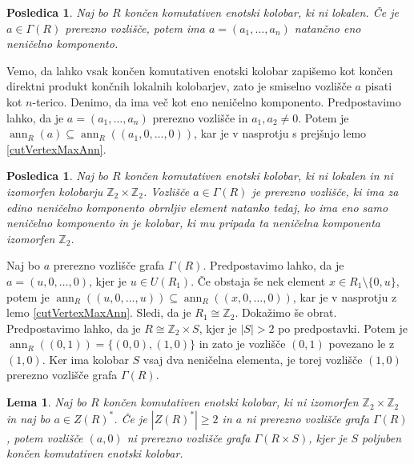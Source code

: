 \documentclass[a4paper, 12pt]{amsart}
\theoremstyle{definition} %
\theoremstyle{plain} %
\newtheorem{lema}[definicija]{Lema}
\newtheorem{posledica}[definicija]{Posledica}
\newcommand{\Z}{\mathbb Z}
\DeclareMathOperator{\ann}{ann}
\begin{document}
\begin{posledica}
\label{cutVertexOneNonzeroComponent}
Naj bo $R$ končen komutativen enotski kolobar, ki ni lokalen. Če je $a\in \Gamma(R)$ prerezno vozlišče, potem ima $a= (a_1,\dots,a_n)$ natančno eno neničelno komponento.
\end{posledica}

\proof
Vemo, da lahko vsak končen komutativen enotski kolobar zapišemo kot končen direktni produkt končnih lokalnih kolobarjev, zato je smiselno vozlišče $a$ pisati kot $n$-terico. Denimo, da ima več kot eno neničelno komponento. Predpostavimo lahko, da je $a=(a_1,\dots,a_n)$ prerezno vozlišče in $a_1,a_2 \neq 0$. Potem je $\ann_R(a) \subseteq \ann_R((a_1,0,\dots,0))$, kar je v nasprotju s prejšnjo lemo \ref{cutVertexMaxAnn}.
\endproof

\begin{posledica}
\label{cutVertexUnitNonzeroComponent}
Naj bo $R$ končen komutativen enotski kolobar, ki ni lokalen in ni izomorfen kolobarju $\Z_2 \times \Z_2$. Vozlišče $a\in \Gamma(R)$ je prerezno vozlišče, ki ima za edino neničelno komponento obrnljiv element natanko tedaj, ko ima eno samo neničelno komponento in je kolobar, ki mu pripada ta neničelna komponenta izomorfen $\Z_2$.
\end{posledica}

\proof
Naj bo $a$ prerezno vozlišče grafa $\Gamma(R)$. Predpostavimo lahko, da je $a=(u,0,\dots,0)$, kjer je $u\in U(R_1)$. Če obstaja še nek element $x\in R_1 \setminus\{0,u\}$, potem je $\ann_R((u,0,\dots,u)) \subseteq \ann_R((x,0,\dots,0))$, kar je v nasprotju z lemo \ref{cutVertexMaxAnn}. Sledi, da je $R_1\cong \Z_2$.
Dokažimo še obrat. Predpostavimo lahko, da je $R\cong \Z_2 \times S$, kjer je $|S|>2$ po predpostavki. Potem je $\ann_R((0,1)) = \{(0,0),(1,0)\}$ in zato je vozlišče $(0,1)$ povezano le z $(1,0)$. Ker ima kolobar $S$ vsaj dva neničelna elementa, je torej vozlišče $(1,0)$ prerezno vozlišče grafa $\Gamma(R)$. 
\endproof

\begin{lema}
\label{notCutVertexProduct}
Naj bo $R$ končen komutativen enotski kolobar, ki ni izomorfen $\Z_2 \times \Z_2$ in naj bo $a\in Z(R)^*$. Če je $|Z(R)^*| \ge 2$ in $a$ ni prerezno vozlišče grafa $\Gamma(R)$, potem vozlišče $(a,0)$ ni prerezno vozlišče grafa $\Gamma(R\times S)$, kjer je $S$ poljuben končen komutativen enotski kolobar.
\end{lema}
\end{document}
